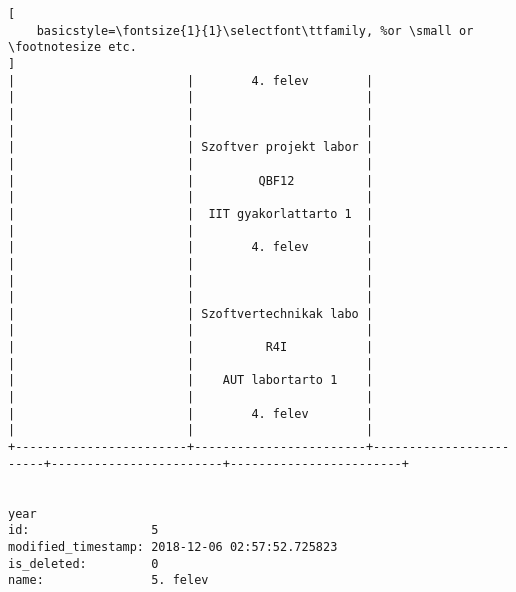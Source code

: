 \begin{lstlisting}[
    basicstyle=\fontsize{1}{1}\selectfont\ttfamily, %or \small or \footnotesize etc.
]
|                        |        4. felev        |                        |                        |                        | 
|                        |                        |                        |                        |                        | 
|                        | Szoftver projekt labor |                        |                        |                        | 
|                        |         QBF12          |                        |                        |                        | 
|                        |  IIT gyakorlattarto 1  |                        |                        |                        | 
|                        |        4. felev        |                        |                        |                        | 
|                        |                        |                        |                        |                        | 
|                        | Szoftvertechnikak labo |                        |                        |                        | 
|                        |          R4I           |                        |                        |                        | 
|                        |    AUT labortarto 1    |                        |                        |                        | 
|                        |        4. felev        |                        |                        |                        | 
+------------------------+------------------------+------------------------+------------------------+------------------------+


year                
id:                 5
modified_timestamp: 2018-12-06 02:57:52.725823
is_deleted:         0
name:               5. felev


\end{lstlisting}
